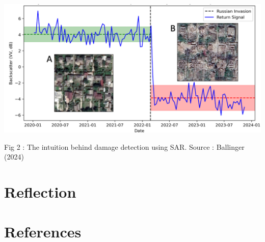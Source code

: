 \documentclass[
  letterpaper,
  DIV=11,
  numbers=noendperiod]{scrreprt}
\begin{document}
\includegraphics[width=5.60417in,height=\textheight]{images/clipboard-2990756776.png}

Fig 2 : The intuition behind damage detection using SAR. Source :
Ballinger (2024)

\hypertarget{reflection-5}{%
\section{Reflection}\label{reflection-5}}

\hypertarget{references-5}{%
\section*{References}\label{references-5}}
\end{document}
